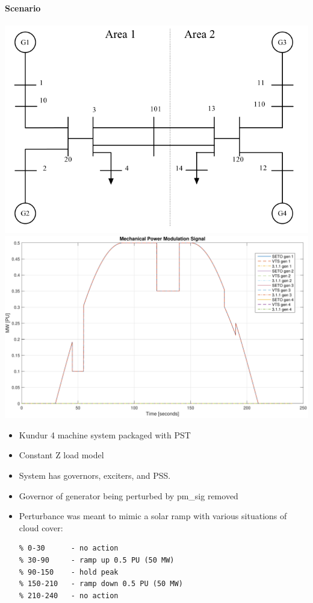 \documentclass[12pt]{article}
\begin{document}
\onehalfspacing
\paragraph{Scenario} \begin{center}
\begin{minipage}{.47\linewidth}
\centering
\includegraphics[width=\linewidth]{../200806-ExtendedVersionComp/sysOneLineAreas}
\includegraphics[width=.8\linewidth]{../200806-ExtendedVersionComp/verPmSig}
\end{minipage} %
\begin{minipage}{.47\linewidth}
\begin{itemize}
\footnotesize
\itemsep 0em
\item Kundur  4 machine system packaged with PST
\item Constant Z load model
\item System has governors, exciters, and PSS.
\item Governor of generator being perturbed by pm\_sig removed
\item Perturbance was meant to mimic a solar ramp with various situations of cloud cover:
\begin{Verbatim}[fontsize=\scriptsize]
% time [seconds]
% 0-30      - no action
% 30-90     - ramp up 0.5 PU (50 MW)
% 90-150    - hold peak
% 150-210   - ramp down 0.5 PU (50 MW)
% 210-240   - no action


\end{Verbatim}
\end{itemize}
\end{minipage}
\end{center}
\end{document}
